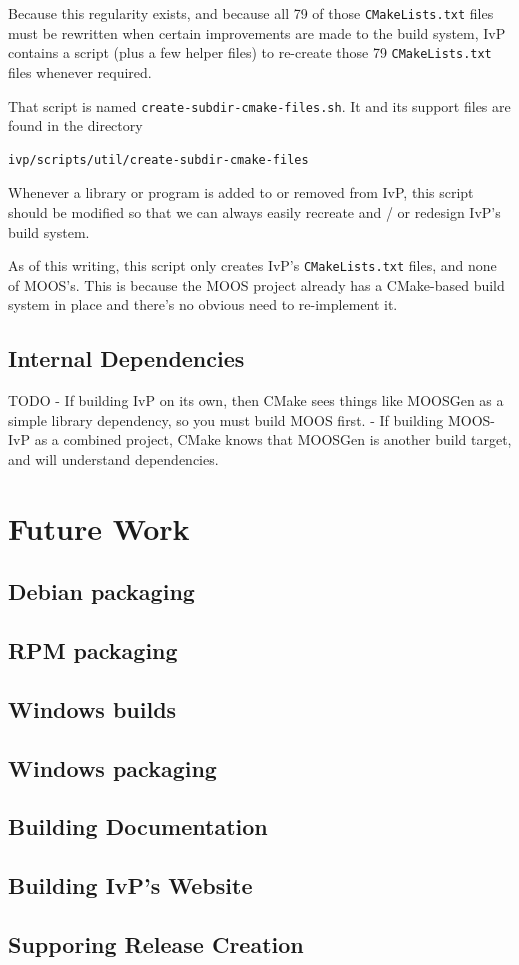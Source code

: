 \documentclass[letterpaper,10pt]{article}
\begin{document}
Because this regularity exists, and because all 79 of those \verb|CMakeLists.txt| files must
be rewritten when certain improvements are made to the build system, IvP contains a
script (plus a few helper files) to re-create those 79 \verb|CMakeLists.txt| files 
whenever required.

That script is named \verb|create-subdir-cmake-files.sh|.  It and its support files are 
found in the directory
\begin{verbatim}
ivp/scripts/util/create-subdir-cmake-files 
\end{verbatim} 

Whenever a library or program is added to or removed from IvP, this script should be
modified so that we can always easily recreate and / or redesign IvP's build system.

As of this writing, this script only creates IvP's \verb|CMakeLists.txt| files, and none
of MOOS's.  This is because the MOOS project already has a CMake-based build system in 
place and there's no obvious need to re-implement it.

\subsection{Internal Dependencies}
TODO
- If building IvP on its own, then CMake sees things like MOOSGen as
a simple library dependency, so you must build MOOS first.
- If building MOOS-IvP as a combined project, CMake knows that MOOSGen
is another build target, and will understand dependencies.

\section{Future Work}


\subsection{Debian packaging}

\subsection{RPM packaging}

\subsection{Windows builds}

\subsection{Windows packaging}

\subsection{Building Documentation}

\subsection{Building IvP's Website}

\subsection{Supporing Release Creation}
\end{document}
